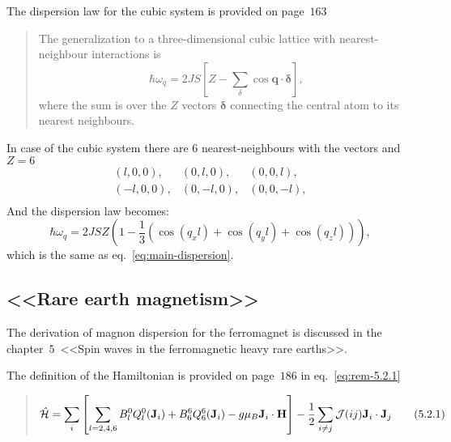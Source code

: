     The dispersion law for the cubic system is provided  on page~$163$
    \begin{quote}
        The generalization to a three-dimensional cubic lattice with nearest-neighbour interactions is
        \begin{equation}
            \hbar \omega_q = 2JS\left[Z - \sum_{\delta}\cos\mathbf{q\cdot\delta}\right],
        \end{equation}
        where the sum is over the $Z$ vectors $\mathbf{\delta}$ connecting the central atom to its nearest neighbours.
    \end{quote}
    In case of the cubic system there are $6$ nearest-neighbours with the vectors and $Z = 6$
    \begin{equation}
        \begin{matrix}
            (l, 0, 0),& (0, l, 0),& (0, 0, l),\\
            (-l, 0, 0),& (0, -l, 0),& (0, 0, -l),\\
        \end{matrix}
    \end{equation}
    And the dispersion law becomes:
    \begin{equation}
        \hbar \omega_q = 2JSZ\left(1 - \dfrac{1}{3}\left(\cos(q_xl) + \cos(q_yl) + \cos(q_zl)\right)\right),
    \end{equation}
    which is the same as eq.~\eqref{eq:main-dispersion}.

\subsection{<<Rare earth magnetism>>\cite{jensen1991rare}}\label{subsec:rem}
    The derivation of magnon dispersion for the ferromagnet is discussed in the chapter~$5$~<<Spin waves in the ferromagnetic heavy rare earths>>.

    The definition of the Hamiltonian is provided on page~$186$ in eq.~\eqref{eq:rem-5.2.1}

    \begin{quote}
        \begin{equation}
            \hat{\mathcal{H}} = \sum_i\left[\sum_{l = 2,4,6}B^0_lQ_l^0(\mathbf{J}_i) + B^6_6Q_6^6(\mathbf{J}_i) - g\mu_B \mathbf{J}_i\cdot\mathbf{H}\right]
            - \dfrac{1}{2} \sum_{i\ne j} \mathcal{J}(ij)\mathbf{J} _i\cdot\mathbf{J}_j\label{eq:rem-5.2.1} \tag{5.2.1}
        \end{equation}
    \end{quote}
    

